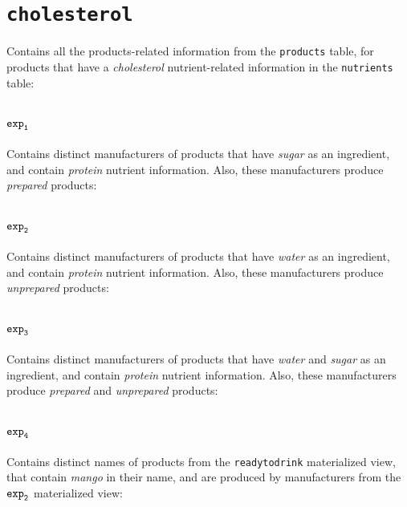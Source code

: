 \section{\texttt{cholesterol}}\label{appendix:sec:cholesterol}
Contains all the products-related information from the \texttt{products} table, for products that have a \textit{cholesterol} nutrient-related information in the \texttt{nutrients} table:



\section{$\texttt{exp}\sb\texttt{1}$}\label{appendix:sec:exp1}
Contains distinct manufacturers of products that have \textit{sugar} as an ingredient, and contain \textit{protein} nutrient information. Also, these manufacturers produce \textit{prepared} products: 



\section{$\texttt{exp}\sb\texttt{2}$}\label{appendix:sec:exp2}
Contains distinct manufacturers of products that have \textit{water} as an ingredient, and contain \textit{protein} nutrient information. Also, these manufacturers produce \textit{unprepared} products: 



\section{$\texttt{exp}\sb\texttt{3}$}\label{appendix:sec:exp3}
Contains distinct manufacturers of products that have \textit{water} and \textit{sugar} as an ingredient, and contain \textit{protein} nutrient information. Also, these manufacturers produce \textit{prepared} and \textit{unprepared} products:



\section{$\texttt{exp}\sb\texttt{4}$}\label{appendix:sec:exp4}
Contains distinct names of products from the \texttt{readytodrink} materialized view, that contain \textit{mango} in their name, and are produced by manufacturers from the $\texttt{exp}\sb\texttt{2}$ materialized view:

